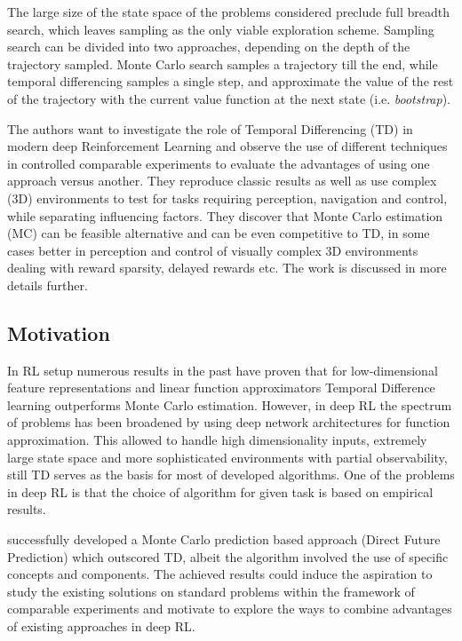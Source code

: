 \documentclass{article}
\begin{document}
The large size of the state space of the problems considered preclude full breadth
search, which leaves sampling as the only viable exploration scheme. Sampling
search can be divided into two approaches, depending on the depth of the trajectory
sampled. Monte Carlo search samples a trajectory till the end, while temporal
differencing samples a single step, and approximate the value of the rest of the
trajectory with the current value function at the next state (i.e. \emph{bootstrap}).

The authors want to investigate the role of Temporal Differencing (TD)
in modern deep Reinforcement Learning and observe the use of
different techniques in controlled comparable experiments to evaluate the
advantages of using one approach versus another.
They reproduce classic results as well as use
complex (3D) environments to test for tasks requiring perception,
navigation and control, while separating influencing factors.
They discover that Monte Carlo estimation
(MC) can be feasible alternative and can be even competitive to TD,
in some cases better
in perception and control of visually complex 3D environments
dealing with reward sparsity, delayed rewards etc.
The work is discussed in more details further.

\subsection{Motivation}
In RL setup numerous results in the past have proven
that for low-dimensional feature representations and linear function
approximators Temporal Difference learning outperforms
Monte Carlo estimation. However, in deep RL the spectrum of problems
has been broadened by using deep network architectures for function
approximation. This allowed to handle high dimensionality inputs,
extremely large state space and more sophisticated environments with partial
observability, still TD serves as the basis for
most of developed algorithms. One of the problems in deep RL is that
the choice of algorithm for given task is based on empirical results.

\citet{DBLP:journals/corr/DosovitskiyK16} successfully developed a Monte Carlo
prediction based approach (Direct Future Prediction) which outscored TD,
albeit the algorithm involved the use of specific concepts and
components. The achieved results
could induce the aspiration to study the existing solutions on standard
problems within the framework of comparable experiments and motivate
to explore the ways to combine advantages of existing approaches in deep RL.
\end{document}
